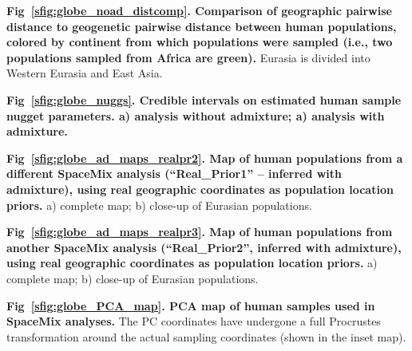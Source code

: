 \documentclass[10pt,letterpaper]{article}
\begin{document}
\label{globe_noad_distcomp}
{\bf{Fig\ \ref{sfig:globe_noad_distcomp}. Comparison of geographic pairwise distance to geogenetic pairwise distance between human populations, colored by continent from which populations were sampled (i.e., two populations sampled from Africa are green).}} Eurasia is divided into Western Eurasia and East Asia.

\label{globe_nuggs}
{\bf{Fig\ \ref{sfig:globe_nuggs}. Credible intervals on estimated human sample nugget parameters. a) analysis without admixture; a) analysis with admixture.}}

\label{globe_ad_maps_realpr2}
{\bf{Fig\ \ref{sfig:globe_ad_maps_realpr2}. Map of human populations from a different SpaceMix analysis (``Real\_Prior1'' -- inferred with admixture), using real geographic coordinates as population location priors.}} a) complete map; b) close-up of Eurasian populations.

\label{globe_ad_maps_realpr3}
{\bf{Fig\ \ref{sfig:globe_ad_maps_realpr3}. Map of human populations from another SpaceMix analysis (``Real\_Prior2'',  inferred with admixture), using real geographic coordinates as population location priors.}}  a) complete map; b) close-up of Eurasian populations.

\label{globe_PCA_map}
{\bf{Fig\ \ref{sfig:globe_PCA_map}. PCA map of human samples used in SpaceMix analyses.}} The PC coordinates have undergone a full Procrustes transformation around the actual sampling coordinates (shown in the inset map).
\end{document}
